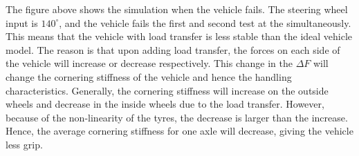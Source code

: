 The figure above shows the simulation when the vehicle fails. The steering wheel input is $140^{\circ}$, and the vehicle fails the first and second test at the simultaneously. This means that the vehicle with load transfer is less stable than the ideal vehicle model. The reason is that upon adding load transfer, the forces on each side of the vehicle will increase or decrease respectively. This change in the $\Delta F$ will change the cornering stiffness of the vehicle and hence the handling characteristics. Generally, the cornering stiffness will increase on the outside wheels and decrease in the inside wheels due to the load transfer. However, because of the non-linearity of the tyres, the decrease is larger than the increase. Hence, the average cornering stiffness for one axle will decrease, giving the vehicle less grip. 